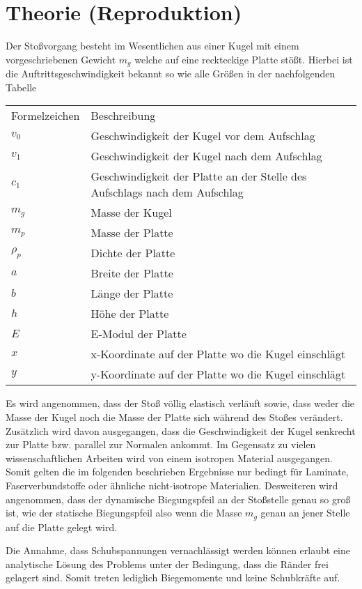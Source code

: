 \chapter{Theorie (Reproduktion)}
\label{chap:Principles}

Der Stoßvorgang besteht im Wesentlichen aus einer Kugel mit einem vorgeschriebenen Gewicht $m_g$ welche auf eine reckteckige Platte stößt. Hierbei ist die Auftrittsgeschwindigkeit bekannt so wie alle Größen in der nachfolgenden Tabelle

\begin{tabular}[h]{l | l}
	Formelzeichen & Beschreibung \\
	$v_0$ & Geschwindigkeit der Kugel vor dem Aufschlag \\
	$v_1$ & Geschwindigkeit der Kugel nach dem Aufschlag \\
	$c_1$ & Geschwindigkeit der Platte an der Stelle des Aufschlags nach dem Aufschlag \\
	$m_g$ & Masse der Kugel \\
	$m_p$ & Masse der Platte\\
	$\rho_p$ & Dichte der Platte\\
	$a$ & Breite der Platte\\
	$b$ & Länge der Platte\\
	$h$ & Höhe der Platte \\
	$E$ & E-Modul der Platte \\
	$x$ & x-Koordinate auf der Platte wo die Kugel einschlägt \\
	$y$ & y-Koordinate auf der Platte wo die Kugel einschlägt \\
\end{tabular}

Es wird angenommen, dass der Stoß völlig elastisch verläuft sowie, dass weder die Masse der Kugel noch die Masse der Platte sich während des Stoßes verändert.
Zusätzlich wird davon ausgegangen, dass die Geschwindigkeit der Kugel senkrecht zur Platte bzw. parallel zur Normalen ankommt. Im Gegensatz zu vielen wissenschaftlichen Arbeiten wird von einem isotropen Material ausgegangen. Somit gelten die im folgenden beschrieben Ergebnisse nur bedingt für Laminate, Faserverbundstoffe oder ähnliche nicht-isotrope Materialien. Desweiteren wird angenommen, dass der dynamische Biegungspfeil an der Stoßstelle genau so groß ist, wie der statische Biegungspfeil also wenn die Masse $m_g$ genau an jener Stelle auf die Platte gelegt wird.

Die Annahme, dass Schubspannungen vernachlässigt werden können erlaubt eine analytische Lösung des Problems unter der Bedingung, dass die Ränder frei gelagert sind. Somit treten lediglich Biegemomente und keine Schubkräfte auf.

